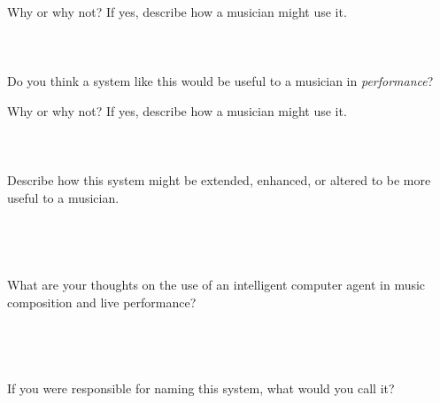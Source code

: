\documentclass[12pt,fleqn]{scrreprt}
\begin{document}
Why or why not? If yes, describe how a musician might use it.
\\\\\\\\

Do you think a system like this would be useful to a musician in \emph{performance}?
\begin{answersA}
    \item {}
    \item {}
\end{answersA}

Why or why not? If yes, describe how a musician might use it.
\\\\\\\\

Describe how this system might be extended, enhanced, or altered to be more useful to a musician.
\\\\\\\\\\

What are your thoughts on the use of an intelligent computer agent in music composition and live performance?
\\\\\\\\\\

If you were responsible for naming this system, what would you call it?
\end{document}
